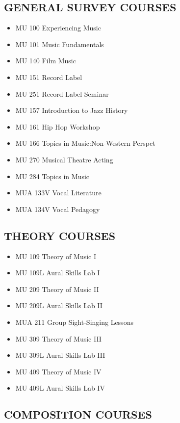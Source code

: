 \documentclass[
  letterpaper,
]{scrbook}
\providecommand{\tightlist}{%
  \setlength{\itemsep}{0pt}\setlength{\parskip}{0pt}}
\begin{document}
\subsection{GENERAL SURVEY COURSES}\label{general-survey-courses}

\begin{itemize}
\tightlist
\item
  MU 100 Experiencing Music
\item
  MU 101 Music Fundamentals
\item
  MU 140 Film Music
\item
  MU 151 Record Label
\item
  MU 251 Record Label Seminar
\item
  MU 157 Introduction to Jazz History
\item
  MU 161 Hip Hop Workshop
\item
  MU 166 Topics in Music:Non-Western Perspct
\item
  MU 270 Musical Theatre Acting
\item
  MU 284 Topics in Music
\item
  MUA 133V Vocal Literature
\item
  MUA 134V Vocal Pedagogy
\end{itemize}

\subsection{THEORY COURSES}\label{theory-courses}

\begin{itemize}
\tightlist
\item
  MU 109 Theory of Music I
\item
  MU 109L Aural Skills Lab I
\item
  MU 209 Theory of Music II
\item
  MU 209L Aural Skills Lab II
\item
  MUA 211 Group Sight-Singing Lessons
\item
  MU 309 Theory of Music III
\item
  MU 309L Aural Skills Lab III
\item
  MU 409 Theory of Music IV
\item
  MU 409L Aural Skills Lab IV
\end{itemize}

\subsection{COMPOSITION COURSES}\label{composition-courses}
\end{document}
